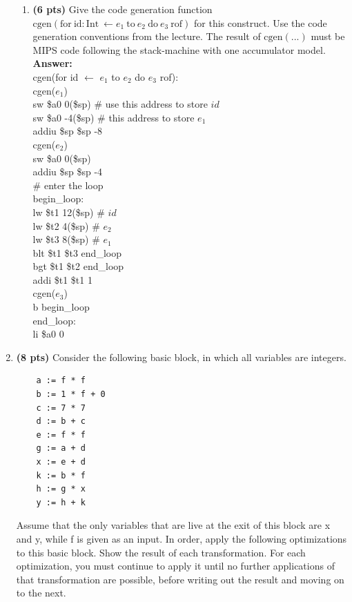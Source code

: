 \documentclass[11pt]{article}
\begin{document}
\begin{enumerate}
\begin{enumerate}
    \item \textbf{(6 pts)} Give the code generation function $\mbox{cgen}(\mbox{for}\ \mbox{id}: \mbox{Int}\ \leftarrow e_1\ \mbox{to}\ e_2\ \mbox{do}\ e_3\ \mbox{rof})$ for this construct. Use the code generation conventions from the lecture. The result of $\mbox{cgen}(...)$ must be MIPS code following the stack-machine with one accumulator model.\\
    \textbf{Answer:} \\
    cgen(for id $\leftarrow$ $e_1$ to $e_2$ do $e_3$ rof): \newline \\
    cgen($e_1$) \\
    sw \$a0 0(\$sp) \# use this address to store $id$ \\
    sw \$a0 -4(\$sp) \# this address to store $e_1$ \\
    addiu \$sp \$sp -8 \\
    cgen($e_2$) \\
    sw \$a0 0(\$sp) \\
    addiu \$sp \$sp -4 \\
    \# enter the loop \\
    begin\_loop: \\
    lw \$t1 12(\$sp) \# $id$ \\
    lw \$t2 4(\$sp) \# $e_2$ \\
    lw \$t3 8(\$sp) \# $e_1$ \\
    blt \$t1 \$t3 end\_loop \\
    bgt \$t1 \$t2 end\_loop \\
    addi \$t1 \$t1 1 \\
    cgen($e_3$) \\
    b begin\_loop \\
    end\_loop: \\
    li \$a0 0
    
   \newpage
  \end{enumerate}
  
  \item \textbf{(8 pts)} Consider the following basic block, in which all variables are integers.
  
  \begin{lstlisting}
    a := f * f
    b := 1 * f + 0
    c := 7 * 7
    d := b + c
    e := f * f
    g := a + d
    x := e + d
    k := b * f
    h := g * x
    y := h + k
  \end{lstlisting}
  
  Assume that the only variables that are live at the exit of this block are x and y, while f is given as an input. In order, apply the following optimizations to this basic block. Show the result of each transformation. For each optimization, you must continue to apply it until no further applications of that transformation are possible, before writing out the result and moving on to the next.
  

\end{enumerate}
\end{document}

